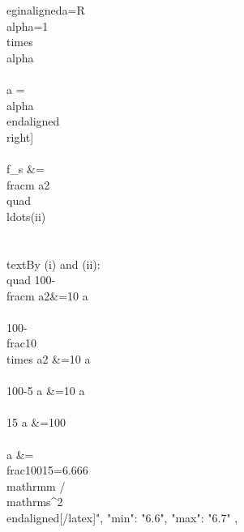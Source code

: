 {egin{aligned}a=R\\alpha=1\\times\\alpha \\\\a = \\alpha\\end{aligned} \\right] \\\\ f_{s} &=\\frac{m a}{2}\\quad\\ldots(ii)\\\\ \\text{By (i) and (ii):}\\quad 100-\\frac{m a}{2}&=10 a\\\\ 100-\\frac{10 \\times a}{2} &=10 a \\\\ 100-5 a &=10 a \\\\ 15 a &=100 \\\\ a &=\\frac{100}{15}=6.666 \\mathrm{m} / \\mathrm{s}^{2} \\end{aligned}[/latex]",
    "min": "6.6",
    "max": "6.7"
  },
